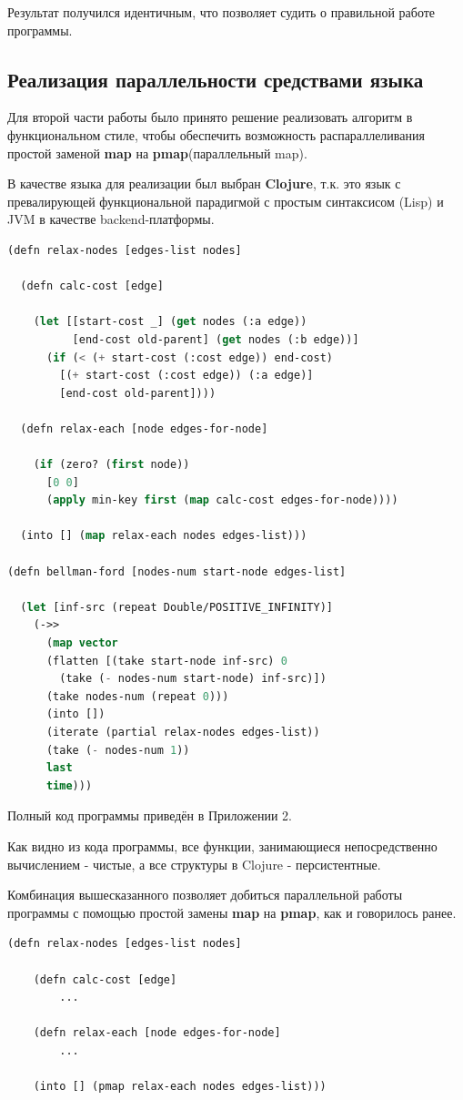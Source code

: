 \documentclass[utf8x, 14pt]{article}
\begin{document}
Результат получился идентичным, что позволяет судить о правильной работе программы.

\subsection{Реализация параллельности средствами языка}

Для второй части работы было принято решение реализовать алгоритм в функциональном стиле, чтобы обеспечить возможность распараллеливания простой заменой \textbf{map} на \textbf{pmap}(параллельный map).

В качестве языка для реализации был выбран \textbf{Clojure}, т.к. это язык с превалирующей функциональной парадигмой с простым синтаксисом (Lisp) и JVM в качестве backend-платформы.

\begin{lstlisting}[language=Lisp, frame=single]
(defn relax-nodes [edges-list nodes]

  (defn calc-cost [edge]

	(let [[start-cost _] (get nodes (:a edge))
          [end-cost old-parent] (get nodes (:b edge))]
	  (if (< (+ start-cost (:cost edge)) end-cost)
		[(+ start-cost (:cost edge)) (:a edge)]
		[end-cost old-parent])))
	
  (defn relax-each [node edges-for-node]

	(if (zero? (first node))
	  [0 0]
	  (apply min-key first (map calc-cost edges-for-node))))

  (into [] (map relax-each nodes edges-list)))

(defn bellman-ford [nodes-num start-node edges-list]

  (let [inf-src (repeat Double/POSITIVE_INFINITY)]
	(->>
	  (map vector
	  (flatten [(take start-node inf-src) 0 
	    (take (- nodes-num start-node) inf-src)])
	  (take nodes-num (repeat 0)))
	  (into [])
	  (iterate (partial relax-nodes edges-list))
	  (take (- nodes-num 1))
	  last
	  time)))
\end{lstlisting}

Полный код программы приведён в Приложении 2.

Как видно из кода программы, все функции, занимающиеся непосредственно вычислением - чистые, а все структуры в Clojure - персистентные.

Комбинация вышесказанного позволяет добиться параллельной работы программы с помощью простой замены \textbf{map} на \textbf{pmap}, как и говорилось ранее.

\begin{lstlisting}[language=Lisp, frame=single]
(defn relax-nodes [edges-list nodes]

	(defn calc-cost [edge]
		...

	(defn relax-each [node edges-for-node]
		...

	(into [] (pmap relax-each nodes edges-list)))
\end{lstlisting}
 
\end{document}
